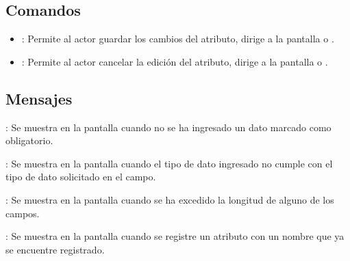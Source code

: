 \subsection{Comandos}
\begin{itemize}
	\item {}: Permite al actor guardar los cambios del atributo, dirige a la pantalla  o .
	\item {}: Permite al actor cancelar la edición del atributo, dirige a la pantalla  o .
\end{itemize}

\subsection{Mensajes}

\begin{Citemize}
	\item {}: Se muestra en la pantalla  cuando no se ha ingresado un dato marcado como obligatorio.
	\item {}: Se muestra en la pantalla  cuando el tipo de dato ingresado no cumple con el tipo de dato solicitado en el campo.
	\item {}: Se muestra en la pantalla  cuando se ha excedido la longitud de alguno de los campos.
	\item {}: Se muestra en la pantalla  cuando se registre un atributo con un nombre que ya se encuentre registrado.
\end{Citemize}
